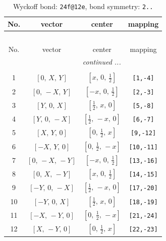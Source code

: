 \documentclass[fleqn,8pt]{jsarticle}
\begin{document}
\renewcommand{\arraystretch}{1.2}
\begin{longtable}{cccc}
\caption{Wyckoff bond: {\tt 24f@12e}, bond symmetry: {\tt 2..}}
 \\
 \hline \hline
No. & vector & center & mapping \\ \hline \endfirsthead

\multicolumn{3}{l}{\tablename\ \thetable{}} \\
 \hline \hline
No. & vector & center & mapping \\ \hline \endhead

 \hline \hline
\multicolumn{3}{r}{\footnotesize\it continued ...} \\ \endfoot

 \hline \hline
\multicolumn{3}{r}{} \\ \endlastfoot

1 & $\left[ 0,\, X,\, Y \right]$ & $\left[ x,\, 0,\, \frac{1}{2} \right]$ & {\tt [1,-4]} \\ \hline
2 & $\left[ 0,\, - X,\, Y \right]$ & $\left[ - x,\, 0,\, \frac{1}{2} \right]$ & {\tt [2,-3]} \\ \hline
3 & $\left[ Y,\, 0,\, X \right]$ & $\left[ \frac{1}{2},\, x,\, 0 \right]$ & {\tt [5,-8]} \\ \hline
4 & $\left[ Y,\, 0,\, - X \right]$ & $\left[ \frac{1}{2},\, - x,\, 0 \right]$ & {\tt [6,-7]} \\ \hline
5 & $\left[ X,\, Y,\, 0 \right]$ & $\left[ 0,\, \frac{1}{2},\, x \right]$ & {\tt [9,-12]} \\ \hline
6 & $\left[ - X,\, Y,\, 0 \right]$ & $\left[ 0,\, \frac{1}{2},\, - x \right]$ & {\tt [10,-11]} \\ \hline
7 & $\left[ 0,\, - X,\, - Y \right]$ & $\left[ - x,\, 0,\, \frac{1}{2} \right]$ & {\tt [13,-16]} \\ \hline
8 & $\left[ 0,\, X,\, - Y \right]$ & $\left[ x,\, 0,\, \frac{1}{2} \right]$ & {\tt [14,-15]} \\ \hline
9 & $\left[ - Y,\, 0,\, - X \right]$ & $\left[ \frac{1}{2},\, - x,\, 0 \right]$ & {\tt [17,-20]} \\ \hline
10 & $\left[ - Y,\, 0,\, X \right]$ & $\left[ \frac{1}{2},\, x,\, 0 \right]$ & {\tt [18,-19]} \\ \hline
11 & $\left[ - X,\, - Y,\, 0 \right]$ & $\left[ 0,\, \frac{1}{2},\, - x \right]$ & {\tt [21,-24]} \\ \hline
12 & $\left[ X,\, - Y,\, 0 \right]$ & $\left[ 0,\, \frac{1}{2},\, x \right]$ & {\tt [22,-23]} \\
\end{longtable}
\end{document}
